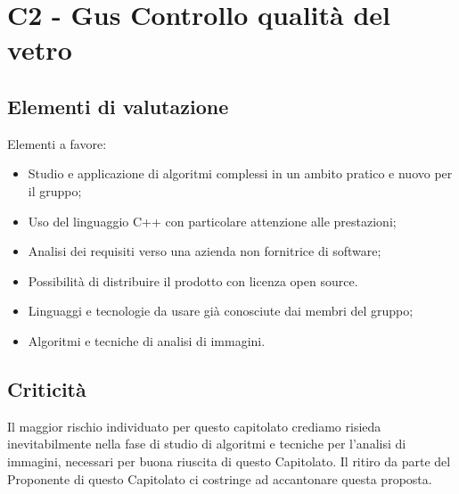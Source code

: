\section{C2 - Gus Controllo qualità del vetro}{
	\subsection{Elementi di valutazione}{
		Elementi a favore:
		\begin{itemize}
			\item Studio e applicazione di algoritmi complessi in un ambito pratico e nuovo per il gruppo;
			\item Uso del linguaggio C++ con particolare attenzione alle prestazioni;
			\item Analisi dei requisiti verso una azienda non fornitrice di software;
			\item Possibilità di distribuire il prodotto con licenza open source.
		\end{itemize}
		
		\begin{itemize}
			\item Linguaggi e tecnologie da usare già conosciute dai membri del gruppo;
			\item Algoritmi e tecniche di analisi di immagini.
		\end{itemize}
	}
	\subsection{Criticità}{
		Il maggior rischio individuato per questo capitolato crediamo risieda inevitabilmente nella fase di studio di algoritmi e tecniche per l'analisi di immagini, necessari per buona riuscita di questo Capitolato.
		Il ritiro da parte del Proponente di questo Capitolato ci costringe ad accantonare questa proposta.
	}
}
